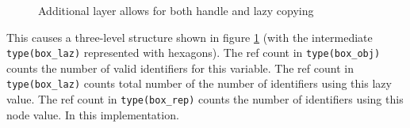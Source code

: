 \begin{figure}
\begin{center}
\caption{Additional layer allows for both handle and lazy copying}
\label{complexfig}
\end{center}
\end{figure}

This causes a three-level structure shown in figure \ref{complexfig}
(with the intermediate \verb+type(box_laz)+ represented with
hexagons).  The ref count in \verb+type(box_obj)+ counts the number of
valid identifiers for this variable.  The ref count in
\verb+type(box_laz)+ counts total number of the number of identifiers
using this lazy value.  The ref count in \verb+type(box_rep)+ counts
the number of identifiers using this node value.  In this
implementation.

